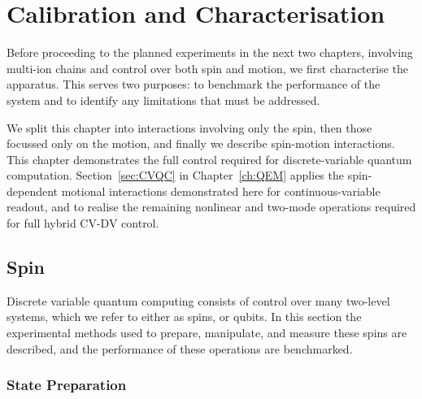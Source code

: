 \chapter{Calibration and Characterisation}
\label{ch:characterisation}
\minitoc

    Before proceeding to the planned experiments in the next two chapters,
    involving multi-ion chains and control over both spin and
    motion, we first characterise the apparatus. This serves two purposes: to
    benchmark the performance of the system and to identify any limitations that
    must be addressed.

    We split this chapter into interactions involving only the spin, then those
    focussed only on the motion, and finally we describe spin-motion
    interactions. This chapter demonstrates the full control required for
    discrete-variable quantum computation. Section~\ref{sec:CVQC} in
    Chapter~\ref{ch:QEM} applies the spin-dependent motional
    interactions demonstrated here for continuous-variable readout, and to
    realise the remaining nonlinear and two-mode operations required
    for full hybrid CV-DV control.


\section{Spin}
\label{sec:Spin}
    Discrete variable quantum computing consists of control over many two-level
    systems, which we refer to either as spins, or qubits. In this section 
    the experimental methods used to prepare, manipulate, and measure these spins are described, and the
    performance of these operations are benchmarked.


\subsection{State Preparation}
\label{sec:Stateprep}

